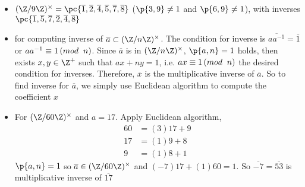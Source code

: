 \documentclass[11pt]{article}
\begin{document}
\begin{definition*}
\begin{itemize}
\[{            }
        \]
        \item {} $\integermodnmul[9] = \pc{\overline{1}, \overline{2}, \overline{4}, \overline{5}, \overline{7}, \overline{8}}$ ($\p{3,9}\neq 1$ and $\p{6,9}\neq 1$), with inverses $\pc{\overline{1}, \overline{5}, \overline{7}, \overline{2}, \overline{4}, \overline{8}}$ 
        \item {} for computing inverse of $\overline{a} \subset \integermodnmul$. The condition for inverse is $\overline{a a^{-1}} = \overline{1}$ or $aa^{-1} \equiv 1 \left(mod \;\; n \right)$. Since $\overline{a}$ is in $\integermodnmul$, $\p{a,n}=1$ holds, then exists $x,y\in \Z^+$ such that $ax + ny = 1$, i.e. $ax \equiv 1 \left(mod \;\; n \right)$ the desired condition for inverses. Therefore, $\overline{x}$ is the multiplicative inverse of $\overline{a}$. So to find inverse for $\overline{a}$, we simply use Euclidean algorithm to compute the coefficient $x$
        \item {} For $\integermodnmul[60]$ and $a=17$. Apply Euclidean algorithm, 
        \begin{align*}
            60 &= (3) 17 + 9 \\
            17 &= (1) 9  + 8 \\
            9  &= (1) 8  + 1
        \end{align*}
        $\p{a,n}=1$ so $\oa \in \integermodnmul[60]$ and $(-7)17 + (1)60 = 1$. So $\overline{-7} = \overline{53}$ is multiplicative inverse of $\overline{17}$
    \end{itemize}
\end{definition*} 



 
\end{document}
